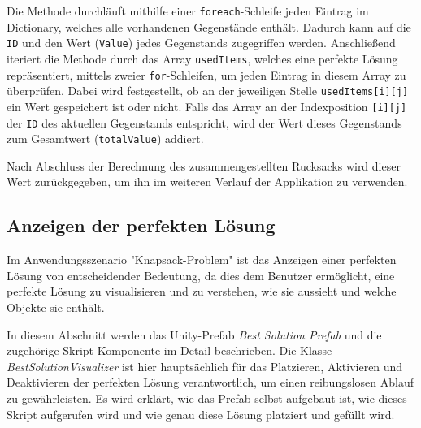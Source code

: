 Die Methode durchläuft mithilfe einer \texttt{foreach}-Schleife jeden Eintrag im Dictionary, welches alle vorhandenen
Gegenstände enthält. Dadurch kann auf die \texttt{ID} und den Wert (\texttt{Value}) jedes Gegenstands zugegriffen werden.
Anschließend iteriert die Methode durch das Array \texttt{usedItems}, welches eine perfekte Lösung repräsentiert, mittels
zweier \texttt{for}-Schleifen, um jeden Eintrag in diesem Array zu überprüfen. Dabei wird festgestellt, ob an der jeweiligen
Stelle \texttt{usedItems[i][j]} ein Wert gespeichert ist oder nicht. Falls das Array an der Indexposition \texttt{[i][j]}
der \texttt{ID} des aktuellen Gegenstands entspricht, wird der Wert dieses Gegenstands zum Gesamtwert (\texttt{totalValue})
addiert.

Nach Abschluss der Berechnung des zusammengestellten Rucksacks wird dieser Wert zurückgegeben, um ihn im weiteren Verlauf
der Applikation zu verwenden.

\subsection{Anzeigen der perfekten Lösung}
Im Anwendungsszenario "Knapsack-Problem" ist das Anzeigen einer perfekten Lösung von entscheidender Bedeutung, da dies dem
Benutzer ermöglicht, eine perfekte Lösung zu visualisieren und zu verstehen, wie sie aussieht und welche Objekte sie enthält.

In diesem Abschnitt werden das Unity-Prefab \textit{Best Solution Prefab} und die zugehörige Skript-Komponente im Detail
beschrieben. Die Klasse \textit{BestSolutionVisualizer} ist hier hauptsächlich für das Platzieren, Aktivieren und Deaktivieren
der perfekten Lösung verantwortlich, um einen reibungslosen Ablauf zu gewährleisten. Es wird erklärt, wie das Prefab
selbst aufgebaut ist, wie dieses Skript aufgerufen wird und wie genau diese Lösung platziert und gefüllt wird.

